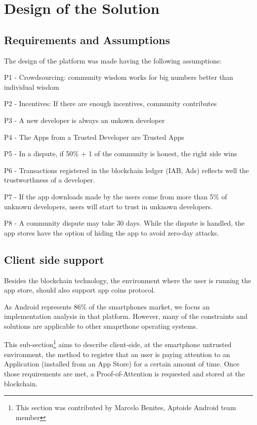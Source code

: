 \section{Design of the Solution}

\label{sec:design}


\subsection{Requirements and Assumptions }


The design of the platform was made having the following assumptions:

P1 - Crowdsourcing: community wisdom works for big numbers better than individual wisdom

P2 - Incentives: If there are enough incentives, community contributes

P3 - A new developer is always an unkown developer

P4 - The Apps from a Trusted Developer are Trusted Apps

P5 - In a dispute, if 50\% + 1 of the community is honest, the right side wins

P6 - Transactions registered in the blockchain ledger (IAB, Ads) reflects well the trustworthness of a developer.

P7 - If the app downloads made by the users come from more than 5\% of unknown developers, users will start to trust in unknown developers.

P8 - A community dispute may take 30 days. While the dispute is handled, the app stores have the option of hiding the app to avoid zero-day attacks.


\subsection{Client side support}

Besides the blockchain technology, the environment where the user is running the app store, should also support app coins protocol.


As Android represents 86\% of the smartphones market, we focus an implementation analysis in that platform. However, many of the constraints and solutions are applicable to other smaprthone operating systems.

This sub-section\footnote{This section was contributed by Marcelo Benites, Aptoide Android team member} aims to describe client-side, at the smartphone untrusted environment, the method to register that an user is paying attention to an Application (installed from an App Store) for a certain amount of time. Once those requirements are met, a Proof-of-Attention is requested and stored at the blockchain.

